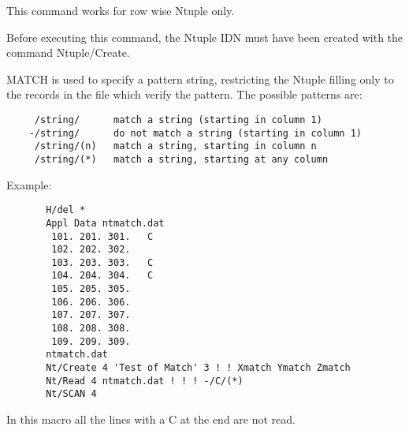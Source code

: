    \par
This command works for row wise Ntuple only.  

   \par
Before executing this command, the Ntuple IDN must have been created with 
   the command Ntuple/Create.  

   \par
MATCH is used to specify a pattern string, restricting the Ntuple filling 
   only to the records in the file which verify the pattern. The possible 
   patterns are:  

\begin{verbatim}
     /string/      match a string (starting in column 1)
    -/string/      do not match a string (starting in column 1)
     /string/(n)   match a string, starting in column n
     /string/(*)   match a string, starting at any column
\end{verbatim}
\ENDVERB
   \par
Example:  
\begin{verbatim}
       H/del *
       Appl Data ntmatch.dat
        101. 201. 301.   C
        102. 202. 302.
        103. 203. 303.   C
        104. 204. 304.   C
        105. 205. 305.
        106. 206. 306.
        107. 207. 307.
        108. 208. 308.
        109. 209. 309.
       ntmatch.dat
       Nt/Create 4 'Test of Match' 3 ! ! Xmatch Ymatch Zmatch
       Nt/Read 4 ntmatch.dat ! ! ! -/C/(*)
       Nt/SCAN 4
\end{verbatim}
   \par
In this macro all the lines with a C at the end are not read.  

\ENDCMD


